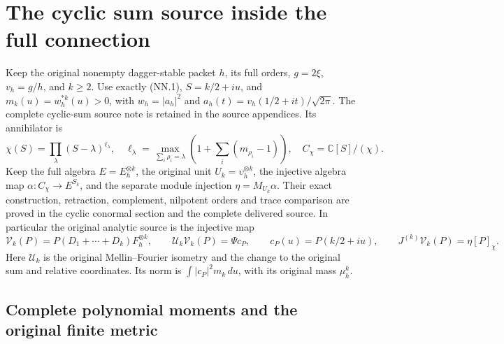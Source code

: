 \section{The cyclic sum source inside the full connection}
\label{sec:cyclic-sum-metric-connection}

Keep the original nonempty dagger-stable packet \(h\), its full orders,
\(g=2\xi\), \(v_h=g/h\), and \(k\ge2\). Use exactly (NN.1),
\(S=k/2+iu\), and \(m_k(u)=w_h^{*k}(u)>0\), with
\(w_h=|a_h|^2\) and \(a_h(t)=v_h(1/2+it)/\sqrt{2\pi}\).
The complete cyclic-sum source note is retained in the source appendices.
Its annihilator is
\[
 \chi(S)=\prod_\lambda(S-\lambda)^{\ell_\lambda},\quad
 \ell_\lambda=\max_{\sum_i\rho_i=\lambda}
               \left(1+\sum_i(m_{\rho_i}-1)\right),\quad
 C_\chi=\mathbb C[S]/(\chi).
 \tag{CM.1}
\]
Keep the full algebra \(E=E_h^{\otimes k}\), the original unit
\(U_k=\upsilon_h^{\otimes k}\), the injective algebra map
\(\alpha:C_\chi\to E^{S_k}\), and the separate module injection
\(\eta=M_{U_k}\alpha\). Their exact construction, retraction,
complement, nilpotent orders and trace comparison are proved in the
cyclic conormal section and the complete delivered source. In particular
the original analytic source is the injective map
\[
 \mathcal V_k(P)=P(D_1+\cdots+D_k)F_h^{\otimes k},\qquad
 \mathscr U_k\mathcal V_k(P)=\Psi c_P,\qquad
 c_P(u)=P(k/2+iu),\qquad
 J^{(k)}\mathcal V_k(P)=\eta[P]_\chi.
 \tag{CM.2}
\]
Here \(\mathscr U_k\) is the original Mellin--Fourier isometry and
the change to the original sum and relative coordinates. Its norm is
\(\int |c_P|^2m_k\,du\), with its original mass \(\mu_h^k\).

\subsection{Complete polynomial moments and the original finite metric}


